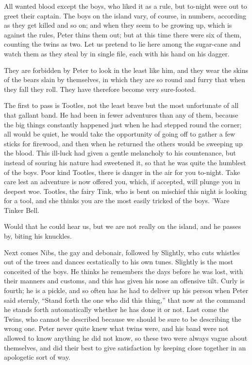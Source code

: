 All wanted blood except the boys, who liked it as a rule, but to-night
were out to greet their captain. The boys on the island vary, of
course, in numbers, according as they get killed and so on; and when
they seem to be growing up, which is against the rules, Peter thins
them out; but at this time there were six of them, counting the twins
as two. Let us pretend to lie here among the sugar-cane and watch them
as they steal by in single file, each with his hand on his dagger.

They are forbidden by Peter to look in the least like him, and they
wear the skins of the bears slain by themselves, in which they are so
round and furry that when they fall they roll. They have therefore
become very sure-footed.

The first to pass is Tootles, not the least brave but the most
unfortunate of all that gallant band. He had been in fewer adventures
than any of them, because the big things constantly happened just when
he had stepped round the corner; all would be quiet, he would take the
opportunity of going off to gather a few sticks for firewood, and then
when he returned the others would be sweeping up the blood. This
ill-luck had given a gentle melancholy to his countenance, but instead
of souring his nature had sweetened it, so that he was quite the
humblest of the boys. Poor kind Tootles, there is danger in the air for
you to-night. Take care lest an adventure is now offered you, which, if
accepted, will plunge you in deepest woe. Tootles, the fairy Tink, who
is bent on mischief this night is looking for a tool, and she thinks
you are the most easily tricked of the boys. 'Ware Tinker Bell.

Would that he could hear us, but we are not really on the island, and
he passes by, biting his knuckles.

Next comes Nibs, the gay and debonair, followed by Slightly, who cuts
whistles out of the trees and dances ecstatically to his own tunes.
Slightly is the most conceited of the boys. He thinks he remembers the
days before he was lost, with their manners and customs, and this has
given his nose an offensive tilt. Curly is fourth; he is a pickle, and
so often has he had to deliver up his person when Peter said sternly,
``Stand forth the one who did this thing,'' that now at the command he
stands forth automatically whether he has done it or not. Last come the
Twins, who cannot be described because we should be sure to be
describing the wrong one. Peter never quite knew what twins were, and
his band were not allowed to know anything he did not know, so these
two were always vague about themselves, and did their best to give
satisfaction by keeping close together in an apologetic sort of way.

